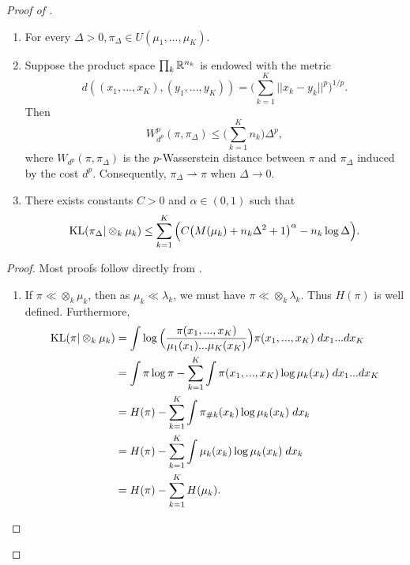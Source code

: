 \begin{proof}[Proof of ]
\begin{lemma}
\begin{enumerate}
        \item For every $\Delta > 0, \pi_{\Delta} \in U(\mu_1, ..., \mu_K)$.

        \item Suppose the product space $\prod_k \mathbb R^{n_k}$ is endowed with the metric
        \begin{equation}
          d((x_1, ..., x_K), (y_1, ..., y_K)) = \Big( \sum_{k=1}^K \vert\vert x_k - y_k \vert\vert^p \Big)^{1/p}.
        \end{equation}
        Then
        \begin{equation}
          W^p_{d^p}(\pi, \pi_{\Delta}) \leq \Big( \sum_{k=1}^K n_k \Big) \Delta^p,
        \end{equation}
        where $W_{d^p}(\pi, \pi_{\Delta})$ is the $p$-Wasserstein distance between $\pi$ and $\pi_{\Delta}$ induced by the cost $d^p$.
        Consequently, $\pi_{\Delta} \rightharpoonup \pi$ when $\Delta \to 0$.

        \item There exists constants $C > 0$ and $\alpha \in (0,1)$ such that
        \begin{equation}
          \text{KL}(\pi_{\Delta} \vert \otimes_k \mu_k) \leq
          \sum_{k=1}^K \Big( C \big( M(\mu_k) + n_k \Delta^2 + 1 \big)^{\alpha} - n_k \log \Delta \Big).
        \end{equation}
      \end{enumerate}
    \end{lemma}
    \begin{proof}
      Most proofs follow directly from \citep{Carlier17}.
      \begin{enumerate}
        \item If $\pi \ll \otimes_k \mu_k$, then as $\mu_k \ll \lambda_k$, we must have $\pi \ll \otimes_k \lambda_k$. Thus $H(\pi)$ is well
        defined. Furthermore,
        \begin{equation}
          \begin{split}
            \text{KL}(\pi \vert \otimes_k \mu_k)
            &= \int \log \Big( \frac{\pi(x_1,...,x_K)}{\mu_1(x_1)...\mu_K(x_K)} \Big) \pi(x_1, ..., x_K) \; dx_1 ... dx_K \\
            &= \int \pi \log \pi - \sum_{k=1}^K \int \pi(x_1, ..., x_K) \log \mu_k(x_k) \; dx_1 ... dx_K \\
            &= H(\pi) - \sum_{k=1}^K \int \pi_{\# k}(x_k) \log \mu_k(x_k) \; dx_k \\
            &= H(\pi) - \sum_{k=1}^K \int \mu_k(x_k) \log \mu_k(x_k) \; dx_k \\
            &= H(\pi) - \sum_{k=1}^K H(\mu_k).
          \end{split}
        \end{equation}


\end{enumerate}
\end{proof}
\end{proof}
